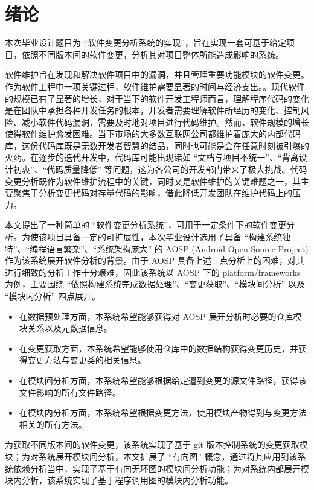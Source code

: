\section{绪论}\label{introduction}

本次毕业设计题目为 “软件变更分析系统的实现”，旨在实现一套可基于给定项目，依照不同版本间的软件变更，分析其对项目整体所能造成影响的系统。

软件维护旨在发现和解决软件项目中的漏洞，并且管理重要功能模块的软件变更。作为软件工程中一项关键过程，软件维护需要显著的时间与经济支出。\cite{SOLEIMANINEYSIANI2020106344}。现代软件的规模已有了显著的增长，对于当下的软件开发工程师而言，理解程序代码的变化是在团队中承担各种开发任务的根本，开发者需要理解软件所经历的变化、控制风险、减小软件代码漏洞，需要及时地对项目进行代码维护\cite{10.1145/2393596.2393656}。然而，软件规模的增长使得软件维护愈发困难。当下市场的大多数互联网公司都维护着庞大的内部代码库，这份代码库既是无数开发者智慧的结晶，同时也可能是会在任意时刻被引爆的火药。在逐步的迭代开发中，代码库可能出现诸如 “文档与项目不统一”、“背离设计初衷”、“代码质量降低” 等问题，这为各公司的开发部门带来了极大挑战。代码变更分析既作为软件维护流程中的关键，同时又是软件维护的关键难题之一，其主要聚焦于分析变更代码对存量代码的影响，借此降低开发团队在维护代码上的压力。

本文提出了一种简单的 “软件变更分析系统”，可用于一定条件下的软件变更分析。为使该项目具备一定的可扩展性，本次毕业设计选用了具备 “构建系统独特”、“编程语言繁杂”、“系统架构庞大” 的 AOSP (Android Open Source Project) 作为该系统展开软件分析的背景。由于 AOSP 具备上述三点分析上的困难，对其进行细致的分析工作十分艰难，因此该系统以 AOSP 下的 platform/frameworks 为例，主要围绕 “依照构建系统完成数据处理”、“变更获取”、“模块间分析” 以及 “模块内分析” 四点展开。

\begin{itemize}
    \item 在数据预处理方面，本系统希望能够获得对 AOSP 展开分析时必要的仓库模块关系以及元数据信息。
    \item 在变更获取方面，本系统希望能够使用仓库中的数据结构获得变更历史，并获得变更方法与变更类的相关信息。
    \item 在模块间分析方面，本系统希望能够根据给定遭到变更的源文件路径，获得该文件影响的所有文件路径。
    \item 在模块内分析方面，本系统希望根据变更方法，使用模块产物得到与变更方法相关的所有方法。
\end{itemize}

为获取不同版本间的软件变更，该系统实现了基于 git 版本控制系统的变更获取模块；为对系统展开模块间分析，本文扩展了 “有向图” 概念，通过将其应用到该系统依赖分析当中，实现了基于有向无环图的模块间分析功能；为对系统内部展开模块内分析，该系统实现了基于程序调用图的模块内分析功能。
